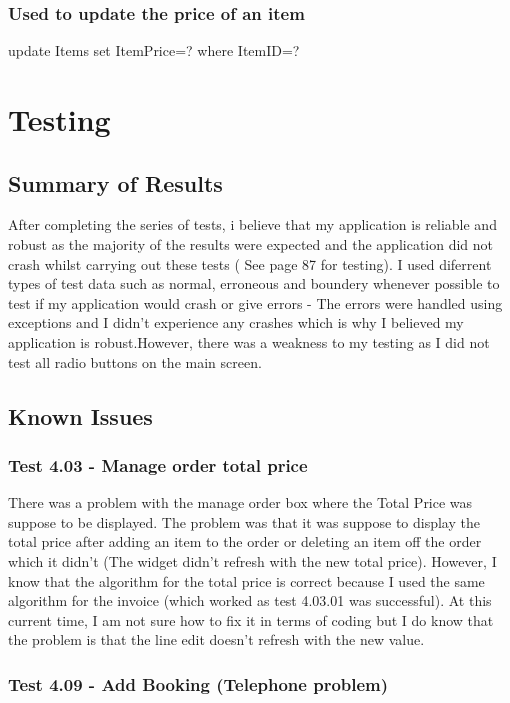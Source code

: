 \subsubsection{Used to update the price of an item}
\begin{sql}
update Items set ItemPrice=? where ItemID=?
\end{sql}

\section{Testing}

\subsection{Summary of Results}
After completing the series of tests, i believe that my application is reliable and robust as the majority of the results were expected and the application did not crash whilst carrying out these tests ( See page 87 for testing). I used diferrent types of test data such as normal, erroneous and boundery whenever possible to test if my application would crash or give errors - The errors were handled using exceptions and I didn't experience any crashes which is why I believed my application is robust.However, there was a weakness to my testing as I did not test all radio buttons on the main screen.


\subsection{Known Issues}

\subsubsection{Test 4.03 - Manage order total price}
There was a problem with the manage order box where the Total Price was suppose to be displayed. The problem was that it was suppose to display the total price after adding an item to the order or deleting an item off the order which it didn't (The widget didn't refresh with the new total price). However, I know that the algorithm for the total price is correct because I used the same algorithm for the invoice (which worked as test 4.03.01 was successful). At this current time, I am not sure how to fix it in terms of coding but I do know that the problem is that the line edit doesn't refresh with the new value.

\subsubsection{Test 4.09 - Add Booking (Telephone problem)}

